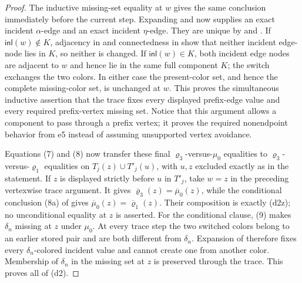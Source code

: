 \begin{proof}
The inductive missing-set equality at \(w\) gives the same conclusion
immediately before the current step.  Expanding
 and  now supplies an exact
incident \(\alpha\)-edge and an exact incident \(\eta\)-edge.  They are
unique by  and
.  If
\(\mathsf{inl}(w)\notin K\), adjacency in
 and connectedness in
 show that neither incident edge-node lies in
\(K\), so neither is changed.  If \(\mathsf{inl}(w)\in K\), both incident
edge nodes are adjacent to \(w\) and hence lie in the same full component
\(K\); the switch exchanges the two colors.  In either case the
present-color set, and hence the complete missing-color set, is unchanged
at \(w\).  This proves the simultaneous
inductive assertion that the trace fixes every displayed prefix-edge value
and every required prefix-vertex missing set.  Notice that this argument
allows a component to pass through a prefix vertex; it proves the required
nonendpoint behavior from e5 instead of assuming unsupported vertex
avoidance.

Equations (7) and (8) now transfer these final
\(\varrho_3\)-versus-\(\mu_0\) equalities to
\(\varrho_3\)-versus-\(\varrho_1\) equalities on
\(T_j(z)\cup T'_j(u)\), with \(u,z\) excluded exactly as in the statement.
If \(z\) is displayed strictly before \(u\) in \(T'_j\), take \(w=z\) in
the preceding vertexwise trace argument.  It gives
\(\overline{\varrho}_3(z)=\overline\mu_0(z)\), while the conditional
conclusion (8a) of  gives
\(\overline\mu_0(z)=\overline{\varrho}_1(z)\).  Their composition is
exactly (d2z); no unconditional equality at \(z\) is asserted.
For the conditional clause, (9) makes \(\delta_n\) missing at \(z\) under
\(\mu_0\).  At every trace step the two switched colors belong to an
earlier stored pair and are both different from \(\delta_n\).  Expansion of
 therefore fixes every
\(\delta_n\)-colored incident value and cannot create one from another
color.  Membership of \(\delta_n\) in the missing set at \(z\) is preserved
through the trace.  This proves all of (d2).


\end{proof}
